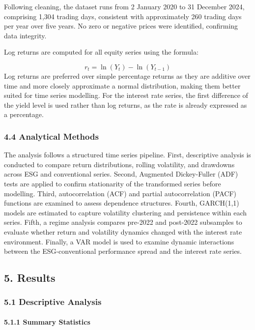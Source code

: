 \documentclass[
]{article}
\begin{document}
Following cleaning, the dataset runs from 2 January 2020 to 31 December
2024, comprising 1,304 trading days, consistent with approximately 260
trading days per year over five years. No zero or negative prices were
identified, confirming data integrity.

Log returns are computed for all equity series using the formula:

\[r_t = \ln(Y_t) - \ln(Y_{t-1})\] Log returns are preferred over simple
percentage returns as they are additive over time and more closely
approximate a normal distribution, making them better suited for time
series modelling. For the interest rate series, the first difference of
the yield level is used rather than log returns, as the rate is already
expressed as a percentage.

\subsubsection{4.4 Analytical Methods}\label{analytical-methods}

The analysis follows a structured time series pipeline. First,
descriptive analysis is conducted to compare return distributions,
rolling volatility, and drawdowns across ESG and conventional series.
Second, Augmented Dickey-Fuller (ADF) tests are applied to confirm
stationarity of the transformed series before modelling. Third,
autocorrelation (ACF) and partial autocorrelation (PACF) functions are
examined to assess dependence structures. Fourth, GARCH(1,1) models are
estimated to capture volatility clustering and persistence within each
series. Fifth, a regime analysis compares pre-2022 and post-2022
subsamples to evaluate whether return and volatility dynamics changed
with the interest rate environment. Finally, a VAR model is used to
examine dynamic interactions between the ESG-conventional performance
spread and the interest rate series.

\subsection{5. Results}\label{results}

\subsubsection{5.1 Descriptive Analysis}\label{descriptive-analysis}

\paragraph{5.1.1 Summary Statistics}\label{summary-statistics}
\end{document}
